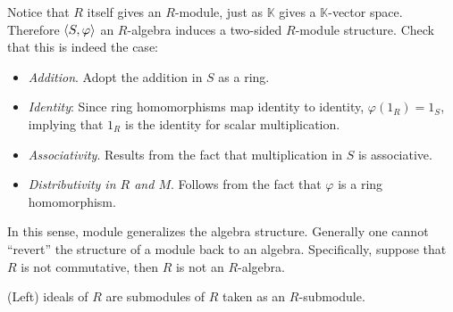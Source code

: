 \begin{remark}
    Notice that $R$ itself gives an $R$-module, just as $\mathbb{K}$ gives a $\mathbb{K}$-vector space. Therefore $\left\langle S, \varphi \right\rangle$ an $R$-algebra induces a two-sided $R$-module structure. Check that this is indeed the case:
    \begin{itemize}
        \item \emph{Addition}. Adopt the addition in $S$ as a ring.
        \item \emph{Identity}: Since ring homomorphisms map identity to identity, $\varphi(1_R) = 1_S$, implying that $1_R$ is the identity for scalar multiplication.
        \item \emph{Associativity}. Results from the fact that multiplication in $S$ is associative.
        \item \emph{Distributivity in $R$ and $M$}. Follows from the fact that $\varphi$ is a ring homomorphism.
    \end{itemize}
    In this sense, module generalizes the algebra structure. Generally one cannot ``revert'' the structure of a module back to an algebra. Specifically, suppose that $R$ is not commutative, then $R$ is not an $R$-algebra.
\end{remark}

\begin{remark}
    (Left) ideals of $R$ are submodules of $R$ taken as an $R$-submodule.
\end{remark}

